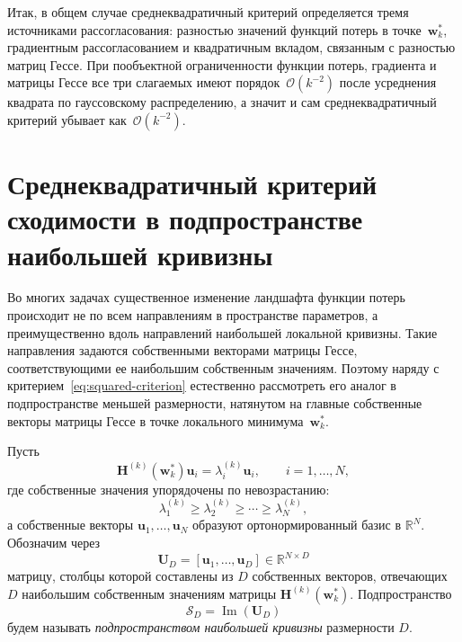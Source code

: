 Итак, в общем случае среднеквадратичный критерий определяется тремя источниками рассогласования: разностью значений функций потерь в точке~$\mathbf w_k^*$, градиентным рассогласованием и квадратичным вкладом, связанным с разностью матриц Гессе. При пообъектной ограниченности функции потерь, градиента и матрицы Гессе все три слагаемых имеют порядок~$\mathcal O(k^{-2})$ после усреднения квадрата по гауссовскому распределению, а значит и сам среднеквадратичный критерий убывает как~$\mathcal O(k^{-2})$.

\section{Среднеквадратичный критерий сходимости в подпространстве наибольшей кривизны}

Во многих задачах существенное изменение ландшафта функции потерь происходит не по всем направлениям в пространстве параметров, а преимущественно вдоль направлений наибольшей локальной кривизны. Такие направления задаются собственными векторами матрицы Гессе, соответствующими ее наибольшим собственным значениям. Поэтому наряду с критерием~\eqref{eq:squared-criterion} естественно рассмотреть его аналог в подпространстве меньшей размерности, натянутом на главные собственные векторы матрицы Гессе в точке локального минимума~$\mathbf w_k^*$.

\begin{definition}
    \label{def:principal-curvature-subspace}
    Пусть
    \begin{equation}
        \mathbf H^{(k)}(\mathbf w_k^*) \mathbf u_i = \lambda_i^{(k)} \mathbf u_i,
        \qquad i=1, \ldots, N,
    \end{equation}
    где собственные значения упорядочены по невозрастанию:
    \begin{equation}
        \lambda_1^{(k)} \geqslant\lambda_2^{(k)} \geqslant \cdots \geqslant\lambda_N^{(k)},
    \end{equation}
    а собственные векторы $\mathbf u_1, \ldots, \mathbf u_N$ образуют ортонормированный базис в $\mathbb R^N$. Обозначим через
    \begin{equation}
        \mathbf U_D = [\mathbf u_1, \ldots, \mathbf u_D] \in \mathbb R^{N\times D}
    \end{equation}
    матрицу, столбцы которой составлены из $D$ собственных векторов, отвечающих $D$ наибольшим собственным значениям матрицы $\mathbf H^{(k)}(\mathbf w_k^*)$. Подпространство
    \begin{equation}
        \mathcal S_D = \operatorname{Im}(\mathbf U_D)
    \end{equation}
    будем называть \emph{подпространством наибольшей кривизны} размерности $D$.
\end{definition}

